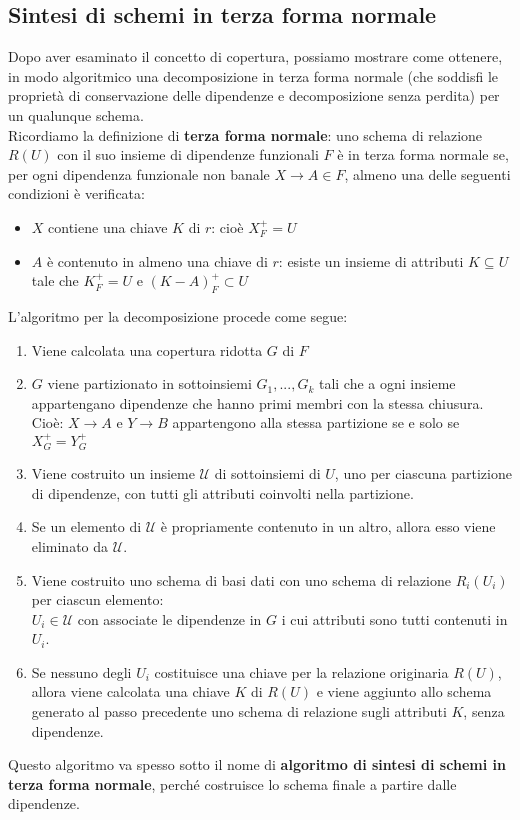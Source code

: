\subsection{Sintesi di schemi in terza forma normale}
Dopo aver esaminato il concetto di copertura, possiamo mostrare come ottenere, in modo algoritmico una decomposizione in terza forma normale (che soddisfi le proprietà di conservazione delle dipendenze e decomposizione senza perdita) per un qualunque schema.\\
Ricordiamo la definizione di \textbf{terza forma normale}: uno schema di relazione $R(U)$ con il suo insieme di dipendenze funzionali $F$ è in terza forma normale se, per ogni dipendenza funzionale non banale $X \rightarrow A \in F$, almeno una delle seguenti condizioni è verificata:
    \begin{itemize}
        \item{$X$ contiene una chiave $K$ di $r$: cioè $X_F^+ = U$}
        \item{$A$ è contenuto in almeno una chiave di $r$: esiste un insieme di attributi $K \subseteq U$ tale che $K_F^+ = U$ e $(K-A)_F^+ \subset U$}
    \end{itemize}
L'algoritmo per la decomposizione procede come segue:
    \begin{enumerate}
        \item{Viene calcolata una copertura ridotta $G$ di $F$}
        \item{$G$ viene partizionato in sottoinsiemi $G_1, ..., G_k$ tali che a ogni insieme appartengano dipendenze che hanno primi membri con la stessa chiusura.\\
        Cioè: $X \rightarrow A$ e $Y \rightarrow B$ appartengono alla stessa partizione se e solo se $X_G^+ = Y_G^+$}
        \item{Viene costruito un insieme $\mathcal{U}$ di sottoinsiemi di $U$, uno per ciascuna partizione di dipendenze, con tutti gli attributi coinvolti nella partizione.}
        \item{Se un elemento di $\mathcal{U}$ è propriamente contenuto in un altro, allora esso viene eliminato da $\mathcal{U}$.}
        \item{Viene costruito uno schema di basi dati con uno schema di relazione $R_i(U_i)$ per ciascun elemento:\\
        $U_i \in \mathcal{U}$ con associate le dipendenze in $G$ i cui attributi sono tutti contenuti in $U_i$.}
        \item{Se nessuno degli $U_i$ costituisce una chiave per la relazione originaria $R(U)$, allora viene calcolata una chiave $K$ di $R(U)$ e viene aggiunto allo schema generato al passo precedente uno schema di relazione sugli attributi $K$, senza dipendenze.}
    \end{enumerate}
Questo algoritmo va spesso sotto  il nome di \textbf{algoritmo di sintesi di schemi in terza forma normale}, perché costruisce lo schema finale a partire dalle dipendenze.

